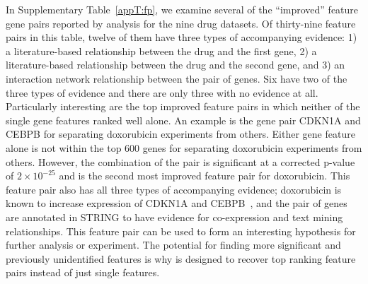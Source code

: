 In Supplementary Table~\ref{appT:fp}, we examine several of the ``improved'' feature gene pairs reported by \genviz analysis for the \lincs nine drug datasets. Of thirty-nine feature pairs in this table, twelve of them have three types of accompanying evidence: 1) a literature-based relationship between the drug and the first gene, 2) a literature-based relationship between the drug and the second gene, and 3) an interaction network relationship between the pair of genes. Six have two of the three types of evidence and there are only three with no evidence at all. Particularly interesting are the top improved feature pairs in which neither of the single gene features ranked well alone. An example is the gene pair CDKN1A and CEBPB for separating doxorubicin experiments from others. Either gene feature alone is not within the top 600 genes for separating doxorubicin experiments from others. However, the combination of the pair is significant at a corrected p-value of $2\times10^{-25}$ and is the second most improved feature pair for doxorubicin. This feature pair also has all three types of accompanying evidence; doxorubicin is known to increase expression of CDKN1A and CEBPB~\cite{zhao2015gene}, and the pair of genes are annotated in STRING to have evidence for co-expression and text mining relationships. This feature pair can be used to form an interesting hypothesis for further analysis or experiment. The potential for finding more significant and previously unidentified features is why \genviz is designed to recover top ranking feature pairs instead of just single features.




